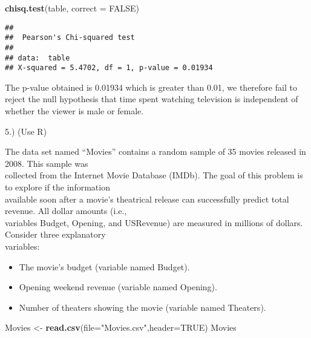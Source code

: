 \documentclass[
]{article}
\newenvironment{Shaded}{\begin{snugshade}}{\end{snugshade}}
\newcommand{\AttributeTok}[1]{\textcolor[rgb]{0.13,0.29,0.53}{#1}}
\newcommand{\ConstantTok}[1]{\textcolor[rgb]{0.56,0.35,0.01}{#1}}
\newcommand{\FunctionTok}[1]{\textcolor[rgb]{0.13,0.29,0.53}{\textbf{#1}}}
\newcommand{\NormalTok}[1]{#1}
\newcommand{\OtherTok}[1]{\textcolor[rgb]{0.56,0.35,0.01}{#1}}
\newcommand{\StringTok}[1]{\textcolor[rgb]{0.31,0.60,0.02}{#1}}
\begin{document}
\begin{Shaded}
\begin{Highlighting}[]
\FunctionTok{chisq.test}\NormalTok{(table, }\AttributeTok{correct =} \ConstantTok{FALSE}\NormalTok{)}
\end{Highlighting}
\end{Shaded}

\begin{verbatim}
## 
##  Pearson's Chi-squared test
## 
## data:  table
## X-squared = 5.4702, df = 1, p-value = 0.01934
\end{verbatim}

The p-value obtained is 0.01934 which is greater than 0.01, we therefore
fail to reject the null hypothesis that time spent watching television
is independent of whether the viewer is male or female.

5.) (Use R)

\hfill\break
The data set named ``Movies'' contains a random sample of 35 movies
released in 2008. This sample was\\
collected from the Internet Movie Database (IMDb). The goal of this
problem is to explore if the information\\
available soon after a movie's theatrical release can successfully
predict total revenue. All dollar amounts (i.e.,\\
variables Budget, Opening, and USRevenue) are measured in millions of
dollars. Consider three explanatory\\
variables:

\begin{itemize}
\item
  The movie's budget (variable named Budget).
\item
  Opening weekend revenue (variable named Opening).
\item
  Number of theaters showing the movie (variable named Theaters).
\end{itemize}

\begin{Shaded}
\begin{Highlighting}[]
\NormalTok{Movies }\OtherTok{\textless{}{-}} \FunctionTok{read.csv}\NormalTok{(}\AttributeTok{file=}\StringTok{"Movies.csv"}\NormalTok{,}\AttributeTok{header=}\ConstantTok{TRUE}\NormalTok{)}
\NormalTok{Movies}
\end{Highlighting}
\end{Shaded}
\end{document}
